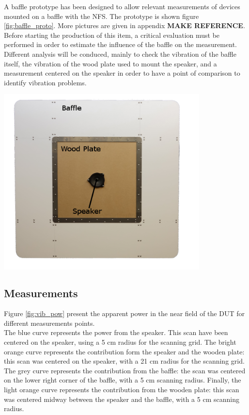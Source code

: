 \documentclass{report}
\begin{document}
\begin{minipage}{0.6\textwidth}
A baffle prototype has been designed to allow relevant measurements of devices mounted on a baffle with the NFS. The prototype is shown figure \ref{fig:baffle_proto}. More pictures are given in appendix \textbf{MAKE REFERENCE}. \\

Before starting the production of this item, a critical evaluation must be performed in order to estimate the influence of the baffle on the measurement. Different analysis will be conduced, mainly to check the vibration of the baffle itself, the vibration of the wood plate used to mount the speaker, and a measurement centered on the speaker in order to have a point of comparison to identify vibration problems.
\end{minipage}
\begin{minipage}{0.4\textwidth}
\begin{center}
	\includegraphics[width=0.8\textwidth]{GridOpti/Baffle_Alone_2} 
    \captionsetup{hypcap=false} 
	\label{fig:baffle_proto}
\end{center}
\end{minipage} 

\subsection{Measurements}

Figure \ref{fig:vib_pow} present the apparent power in the near field of the DUT for different measurements points. \\
The blue curve represents the power from the speaker. This scan have been centered on the speaker, using a 5 cm radius for the scanning grid. The bright orange curve represents the contribution form the speaker and the wooden plate: this scan was centered on the speaker, with a 21 cm radius for the scanning grid. The grey curve represents the contribution from the baffle: the scan was centered on the lower right corner of the baffle, with a 5 cm scanning radius. Finally, the light orange curve represents the contribution from the wooden plate: this scan was centered midway between the speaker and the baffle, with a 5 cm scanning radius. \\
\end{document}
